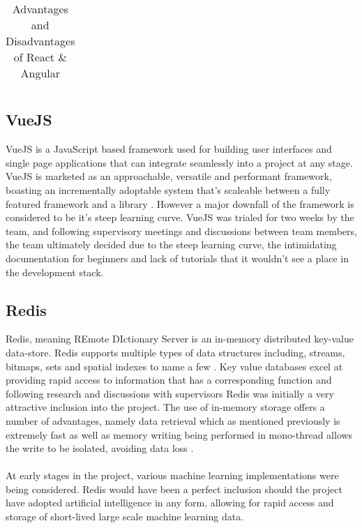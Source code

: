 \begin{table}[htp]
\begin{tabularx}{\linewidth}{>{\parskip1ex}X@{\kern4\tabcolsep}>{\parskip1ex}X}
\\\bottomrule
\end{tabularx}
\caption{Advantages and Disadvantages of React \& Angular}
\end{table}

\subsection{VueJS}
VueJS is a JavaScript based framework used for building user interfaces and single page applications that can integrate seamlessly into a project at any stage. VueJS is marketed as an approachable, versatile and performant framework, boasting an incrementally adoptable system that's scaleable between a fully featured framework and a library \cite{VUE}. However a major downfall of the framework is considered to be it's steep learning curve. VueJS was trialed for two weeks by the team, and following supervisory meetings and discussions between team members, the team ultimately decided due to the steep learning curve, the intimidating documentation for beginners and lack of tutorials that it wouldn't see a place in the development stack.

\subsection{Redis}
Redis, meaning REmote DIctionary Server is an in-memory distributed key-value data-store. Redis supports multiple types of data structures including, streams, bitmaps, sets and spatial indexes to name a few \cite{REDIS_IO}. Key value databases excel at providing rapid access to information that has a corresponding function and following research and discussions with supervisors Redis was initially a very attractive inclusion into the project. The use of in-memory storage offers a number of advantages, namely data retrieval which as mentioned previously is extremely fast as well as memory writing being performed in mono-thread allows the write to be isolated, avoiding data loss \cite{REDIS}.

\paragraph{}
At early stages in the project, various machine learning implementations were being considered. Redis would have been a perfect inclusion should the project have adopted artificial intelligence in any form, allowing for rapid access and storage of short-lived large scale machine learning data.

